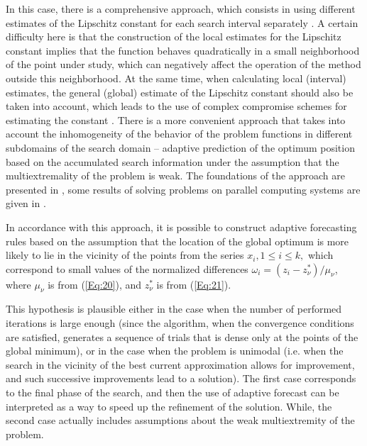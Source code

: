 \documentclass[
11pt,%
tightenlines,%
twoside,%
onecolumn,%
nofloats,%
nobibnotes,%
nofootinbib,%
superscriptaddress,%
noshowpacs,%
centertags]%
{revtex4}
\begin{document}
In this case, there is a comprehensive approach, which consists in using different estimates of the Lipschitz constant for each search interval separately \cite{Sergeyev2003,Sergeyev2007}. 
A certain difficulty here is that the construction of the local estimates for the Lipschitz constant implies that the function behaves quadratically in a small neighborhood of the point under study, which can negatively affect the operation of the method outside this neighborhood.
At the same time, when calculating local (interval) estimates, the general (global) estimate of the Lipschitz constant should also be taken into account, which leads to the use of complex compromise schemes for estimating the constant \cite{Sergeyev2020}.
There is a more convenient approach that takes into account the inhomogeneity of the behavior of the problem functions in different subdomains of the search domain -- adaptive prediction of the optimum position based on the accumulated search information under the assumption that the multiextremality of the problem is weak. The foundations of the approach are presented in \cite{Strongin2000}, some results of solving problems on parallel computing systems are given in  \cite{Barkalov2010}.

In accordance with this approach, it is possible to construct adaptive forecasting rules based on the assumption that the location of the global optimum is more likely to lie in the vicinity of the points from the series $x_i, 1 \leq i \leq k,$ which correspond to small values of the normalized differences $\omega_i=(z_i-z_\nu^*)/\mu_\nu$, where $\mu_\nu$ is from (\ref{Eq:20}), and $z_\nu^*$ is from  (\ref{Eq:21}).

This hypothesis is plausible either in the case when the number of performed iterations is large enough (since the algorithm, when the convergence conditions are satisfied, generates a sequence of trials that is dense only at the points of the global minimum), or in the case when the problem is unimodal (i.e. when the search in the vicinity of the best current approximation allows for improvement, and such successive improvements lead to a solution). The first case corresponds to the final phase of the search, and then the use of adaptive forecast can be interpreted as a way to speed up the refinement of the solution. While, the second case actually includes assumptions about the weak multiextremity of the problem.
\end{document}
